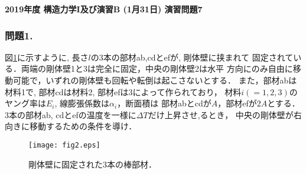 \documentclass[10pt,a4j]{jarticle}
\newlength{\minitwocolumn}
\begin{document}
\newcommand{\fat}[1]{\mbox{\boldmath $#1$}}
\newcommand{\D}{\partial}
\newcommand{\w}{\omega}
\newcommand{\ga}{\alpha}
\newcommand{\gb}{\beta}
\newcommand{\gx}{\xi}
\newcommand{\gz}{\zeta}
\newcommand{\vhat}[1]{\hat{\fat{#1}}}
\newcommand{\spc}{\vspace{0.7\baselineskip}}
\newcommand{\halfspc}{\vspace{0.3\baselineskip}}

\pagestyle{empty}
\newcommand{\twofig}[2]
 {
   \begin{figure}[h]
     \begin{minipage}[t]{\minitwocolumn}
         \begin{center}   #1
         \end{center}
     \end{minipage}
         \hspace{\columnsep}
     \begin{minipage}[t]{\minitwocolumn}
         \begin{center} #2
         \end{center}
     \end{minipage}
   \end{figure}
 }
\begin{center}
{\Large \bf 2019年度 構造力学I及び演習B (1月31日) 演習問題7 } \\
\end{center}
\subsubsection*{問題1.}
図\ref{fig:fig2}に示すように, 長さ$l$の3本の部材ab,cdとefが, 剛体壁に挟まれて
固定されている．両端の剛体壁1と3は完全に固定，中央の剛体壁2は水平
方向にのみ自由に移動可能で，いずれの剛体壁も回転や転倒は起こさないとする．
また，部材abは材料1で, 部材cdは材料2, 部材efは3によって作られており，
材料$i(=1,2,3)$のヤング率は$E_i$, 線膨張係数は$\alpha_i$，断面積は
部材abとcdが$A$，部材efが$2A$とする．
3本の部材ab, cdとefの温度を一様に$\Delta T$だけ上昇させ,るとき，
中央の剛体壁が右向きに移動するための条件を導け．
\begin{figure}[h]
	\begin{center}
	\texttt{[image: fig2.eps]} 
	\end{center}
	\caption{剛体壁に固定された3本の棒部材．} 
	\label{fig:fig2}
\end{figure}
\end{document}
